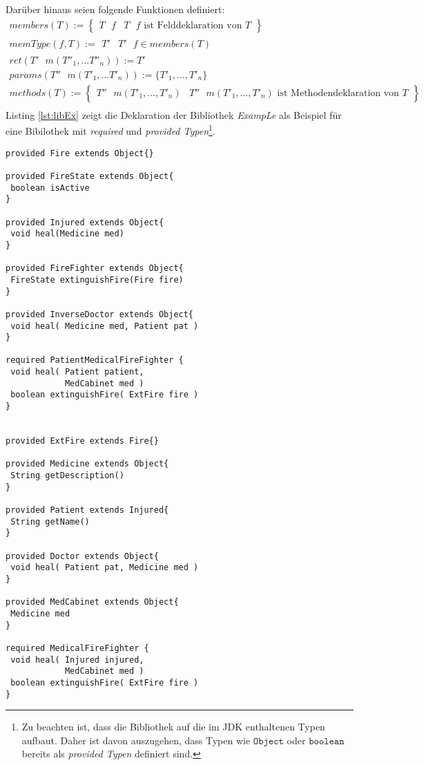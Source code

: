 \noindent
Darüber hinaus seien folgende Funktionen definiert:
\begin{gather*}
\mathit{members(T)} :=  \left\{ 
				\begin{array}{l|l}
					T \texttt{ }\mathit{f} & T \texttt{ }\mathit{f}\text{ ist Felddeklaration von }T
				\end{array}
              \right\}
\\
\mathit{memType(f,T)} := 
				\begin{array}{l|l}
					T' & T' \texttt{ }\mathit{f} \in \mathit{members(T)}
				\end{array}   
\\
\mathit{ret(T'\text{ }m(T''_1,...T''_n))} := T'
\\
\mathit{params(T''\text{ }m(T'_1,...T'_n))} := \{ T'_1,...,T'_n \}
\\   
\mathit{methods(T)} := \left\{ 
				\begin{array}{l|l}
					T'' \text{ }m(T'_1,...,T'_n) & T'' \text{ }m(T'_1,...,T'_n) \text{ ist Methodendeklaration von }T
				\end{array}
              \right\}
\\        
\end{gather*}
\noindent
Listing \ref{lst:libEx} zeigt die Deklaration der Bibliothek \emph{ExampLe} als Beispiel für eine Bibilothek mit \emph{required} und \emph{provided Typen}\footnote{Zu beachten ist, dass die Bibliothek auf die im JDK enthaltenen Typen aufbaut. Daher ist davon auszugehen, dass Typen wie $\texttt{Object}$ oder $\texttt{boolean}$ bereits als \emph{provided Typen} definiert sind.}.
\noindent
\begin{multicols}{2}
\begin{lstlisting}[caption={Bibliothek \emph{ExampLe} von Typen},captionpos=b, style = dsl, label=lst:libEx]
provided Fire extends Object{}

provided FireState extends Object{
 boolean isActive
}

provided Injured extends Object{
 void heal(Medicine med)	
}

provided FireFighter extends Object{
 FireState extinguishFire(Fire fire)
}

provided InverseDoctor extends Object{	
 void heal( Medicine med, Patient pat )
}

required PatientMedicalFireFighter {
 void heal( Patient patient, 
            MedCabinet med )
 boolean extinguishFire( ExtFire fire )	
}


provided ExtFire extends Fire{}

provided Medicine extends Object{
 String getDescription()
}

provided Patient extends Injured{
 String getName()
}

provided Doctor extends Object{	
 void heal( Patient pat, Medicine med )
}

provided MedCabinet extends Object{
 Medicine med
}

required MedicalFireFighter {
 void heal( Injured injured, 
            MedCabinet med )
 boolean extinguishFire( ExtFire fire )	
}
\end{lstlisting}
\end{multicols}
\noindent

